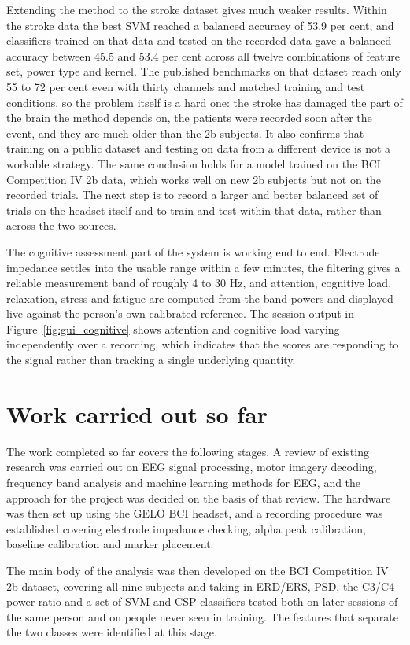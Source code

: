 Extending the method to the stroke dataset gives much weaker results. Within the stroke
data the best SVM reached a balanced accuracy of 53.9 per cent, and classifiers trained on
that data and tested on the recorded data gave a balanced accuracy between 45.5 and 53.4
per cent across all twelve combinations of feature set, power type and kernel. The published benchmarks on that dataset reach
only 55 to 72 per cent even with thirty channels and matched training and test conditions,
so the problem itself is a hard one: the stroke has damaged the part of the brain the
method depends on, the patients were recorded soon after the event, and they are much
older than the 2b subjects. It also confirms that training on a public dataset and
testing on data from a different device is not a workable strategy. The same conclusion
holds for a model trained on the BCI Competition IV 2b data, which works well on new 2b
subjects but not on the recorded trials. The next step is to
record a larger and better balanced set of trials on the headset itself and to train and
test within that data, rather than across the two sources.

The cognitive assessment part of the system is working end to end. Electrode impedance
settles into the usable range within a few minutes, the filtering gives a reliable
measurement band of roughly 4 to 30 Hz, and attention, cognitive load, relaxation, stress
and fatigue are computed from the band powers and displayed live against the person's own
calibrated reference. The session output in Figure~\ref{fig:gui_cognitive} shows attention
and cognitive load varying independently over a recording, which indicates that the scores
are responding to the signal rather than tracking a single underlying quantity.

\section{Work carried out so far}

The work completed so far covers the following stages. A review of existing research was
carried out on EEG signal processing, motor imagery decoding, frequency band analysis and
machine learning methods for EEG, and the approach for the project was decided on the basis
of that review. The hardware was then set up using the GELO BCI headset, and a recording
procedure was established covering electrode impedance checking, alpha peak calibration,
baseline calibration and marker placement.

The main body of the analysis was then developed on the BCI Competition IV 2b dataset,
covering all nine subjects and taking in ERD/ERS, PSD, the C3/C4 power ratio and a set of
SVM and CSP classifiers tested both on later sessions of the same person and on people
never seen in training. The features that separate the two classes were identified at this
stage.

